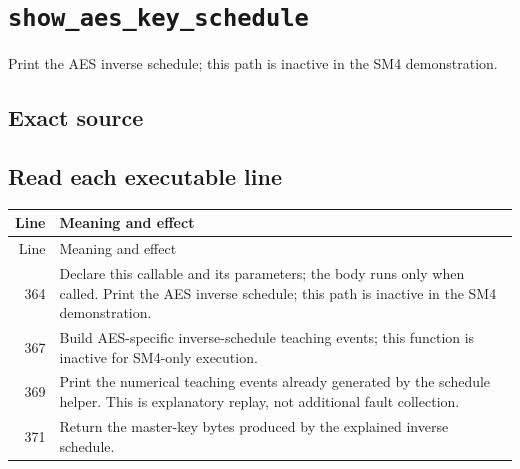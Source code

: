 \section{\texttt{show\_aes\_key\_schedule}}
Print the AES inverse schedule; this path is inactive in the SM4 demonstration.
\begin{center}\end{center}
\subsection*{Exact source}
\subsection*{Read each executable line}
\begingroup\small\begin{longtable}{r >{\raggedright\arraybackslash}p{138mm}}\toprule Line&Meaning and effect\\\midrule\endfirsthead\toprule Line&Meaning and effect\\\midrule\endhead
364&Declare this callable and its parameters; the body runs only when called. Print the AES inverse schedule; this path is inactive in the SM4 demonstration.\\
367&Build AES-specific inverse-schedule teaching events; this function is inactive for SM4-only execution.\\
369&Print the numerical teaching events already generated by the schedule helper. This is explanatory replay, not additional fault collection.\\
371&Return the master-key bytes produced by the explained inverse schedule.\\
\bottomrule\end{longtable}\endgroup
